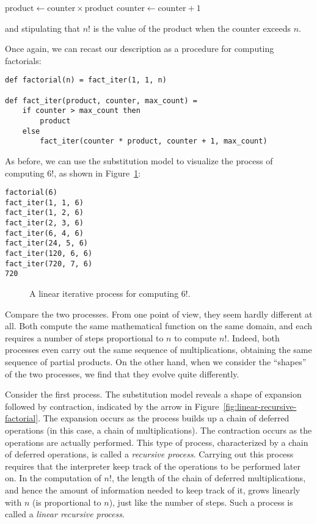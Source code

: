 $\text{product} \leftarrow \text{counter} \times \text{product}$
$\text{counter} \leftarrow \text{counter} + 1$

and stipulating that $n!$ is the value of the product when the counter exceeds $n$.

Once again, we can recast our description as a procedure for computing factorials:

\begin{lstlisting}
def factorial(n) = fact_iter(1, 1, n)

def fact_iter(product, counter, max_count) =
    if counter > max_count then
        product
    else
        fact_iter(counter * product, counter + 1, max_count)
\end{lstlisting}

As before, we can use the substitution model to visualize the process of computing $6!$, as shown in Figure~\ref{fig:linear-iterative-factorial}:

\begin{verbatim}
factorial(6)
fact_iter(1, 1, 6)
fact_iter(1, 2, 6)
fact_iter(2, 3, 6)
fact_iter(6, 4, 6)
fact_iter(24, 5, 6)
fact_iter(120, 6, 6)
fact_iter(720, 7, 6)
720
\end{verbatim}

\begin{figure}[h]
\centering
\caption{A linear iterative process for computing $6!$.}
\label{fig:linear-iterative-factorial}
\end{figure}

Compare the two processes. From one point of view, they seem hardly different at all. Both compute the same mathematical function on the same domain, and each requires a number of steps proportional to $n$ to compute $n!$. Indeed, both processes even carry out the same sequence of multiplications, obtaining the same sequence of partial products. On the other hand, when we consider the ``shapes'' of the two processes, we find that they evolve quite differently.

Consider the first process. The substitution model reveals a shape of expansion followed by contraction, indicated by the arrow in Figure~\ref{fig:linear-recursive-factorial}. The expansion occurs as the process builds up a chain of deferred operations (in this case, a chain of multiplications). The contraction occurs as the operations are actually performed. This type of process, characterized by a chain of deferred operations, is called a \textit{recursive process}. Carrying out this process requires that the interpreter keep track of the operations to be performed later on. In the computation of $n!$, the length of the chain of deferred multiplications, and hence the amount of information needed to keep track of it, grows linearly with $n$ (is proportional to $n$), just like the number of steps. Such a process is called a \textit{linear recursive process}.

